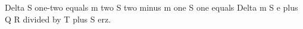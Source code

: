 Delta S one-two equals m two S two minus m one S one equals Delta m S e plus Q R divided by T plus S erz.